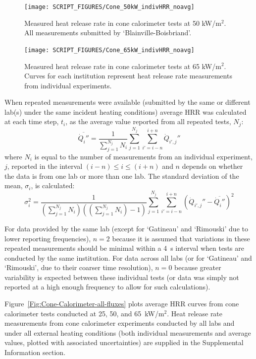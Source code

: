\documentclass{book}
\begin{document}
\begin{figure}
  \centering
  \texttt{[image: SCRIPT\_FIGURES/Cone\_50kW\_indivHRR\_noavg]}
  \caption{Measured heat release rate in cone calorimeter tests at 50 kW/m$^2$. All measurements submitted by ‘Blainville-Boisbriand’.}
  \label{Fig:Cone_50kWindivHRR}
\end{figure}

\begin{figure}
  \centering
  \texttt{[image: SCRIPT\_FIGURES/Cone\_65kW\_indivHRR\_noavg]}
  \caption{Measured heat release rate in cone calorimeter tests at 65 kW/m$^2$. Curves for each institution represent heat release rate measurements from individual experiments.}
  \label{Fig:Cone_65kWindivHRR}
\end{figure}

When repeated measurements were available (submitted by the same or different lab(s) under the same incident heating conditions) average HRR was calculated at each time step, $t_i$, as the average value reported from all repeated tests, $N_j$:
\begin{equation}
  \overline{\dot{Q}_i''} = \frac{1}{\sum_{j=1}^{N_j}N_i} \sum_{j=1}^{N_j} \sum_{i'=i-n}^{i+n} \dot{Q}_{i',j}''
\end{equation}
where $N_i$ is equal to the number of measurements from an individual experiment, $j$, reported in the interval $(i-n) \leq i \leq (i+n)$ and $n$ depends on whether the data is from one lab or more than one lab. The standard deviation of the mean, $\sigma_i$, is calculated:
\begin{equation}
   \sigma_i^2 = \frac{1}{(\sum_{j=1}^{N_j}N_i)((\sum_{j=1}^{N_j}N_i)-1)}   \sum_{j=1}^{N_j} \sum_{i'=i-n}^{i+n} \left( \dot{Q}_{i',j}'' - \overline{\dot{Q}_i''} \right)^2
\end{equation}

For data provided by the same lab (except for ‘Gatineau’ and ‘Rimouski’ due to lower reporting frequencies), $n=2$ because it is assumed that variations in these repeated measurements should be minimal within a 4~s interval when tests are conducted by the same institution. For data across all labs (or for ‘Gatineau’ and ‘Rimouski’, due to their coarser time resolution), $n=0$ because greater variability is expected between these individual tests (or data was simply not reported at a high enough frequency to allow for such calculations).


Figure~\ref{Fig:Cone-Calorimeter-all-fluxes} plots average HRR curves from cone calorimeter tests conducted at 25, 50, and 65~kW/m$^2$. Heat release rate measurements from cone calorimeter experiments conducted by all labs and under all external heating conditions (both individual measurements and average values, plotted with associated uncertainties) are supplied in the Supplemental Information section.
\end{document}
